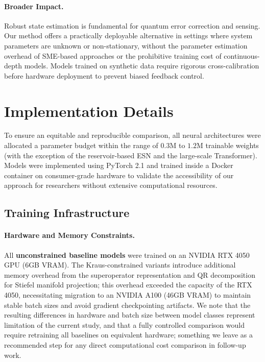 \documentclass{article} %
\begin{document}
\paragraph{Broader Impact.} Robust state estimation is fundamental for quantum error correction and sensing\citep{nielsen2010quantum}. Our method offers a practically deployable alternative in settings where 
system parameters are unknown or non-stationary, without the parameter estimation overhead of SME-based approaches or the prohibitive training cost of continuous-depth models. Models trained on synthetic data require rigorous cross-calibration before hardware deployment to prevent biased feedback control.





\appendix


\section{Implementation Details}
\label{app:implementation}



To ensure an equitable and reproducible comparison, all neural architectures were allocated a parameter budget within the range of $0.3$M to $1.2$M trainable weights (with the exception of the reservoir-based ESN and the large-scale Transformer). Models were implemented using PyTorch 2.1 \cite{paszke2019pytorch} and trained inside a Docker container on consumer-grade hardware to validate the accessibility of our approach for researchers without extensive computational resources.

\subsection{Training Infrastructure}

\paragraph{Hardware and Memory Constraints.}
All \textbf{unconstrained baseline models} were trained on an NVIDIA RTX 4050 GPU (6GB VRAM). The Kraus-constrained variants introduce additional memory overhead from the superoperator representation and QR 
decomposition for Stiefel manifold projection; this overhead exceeded the capacity of the RTX 4050, necessitating migration to an NVIDIA A100 (46GB VRAM) to maintain stable batch sizes and avoid gradient checkpointing artifacts. We note that the resulting differences in hardware and batch size between model classes represent limitation of the current study, and that a fully controlled comparison would require retraining all baselines on equivalent hardware; something 
we leave as a recommended step for any direct computational cost 
comparison in follow-up work.
\end{document}
